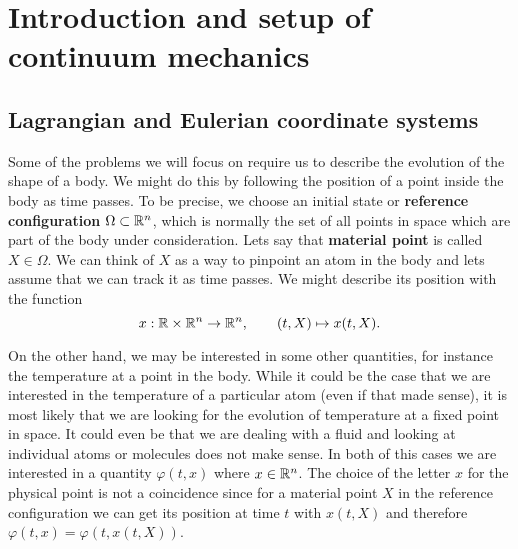 \section{Introduction and setup of continuum mechanics}

\subsection{Lagrangian and Eulerian coordinate systems}

Some of the problems we will focus on require us to describe the evolution of
the shape of a body. We might do this by following the position of a point
inside the body as time passes. To be precise, we choose an initial state or
\textbf{reference configuration} $\Omega \subset \mathbb{R}^n$, which is normally the
set of all points in space which are part of the body under consideration. Lets
say that \textbf{material point} is called $X \in \Omega$. We can think of $X$
as a way to pinpoint an atom in the body and lets assume that we can track it
as time passes. We might describe its position with the function
\[
  x : \mathbb{R} \times \mathbb{R}^n \to \mathbb{R}^n,\qquad (t, X) \mapsto x(t, X).
\]

On the other hand, we may be interested in some other quantities, for instance
the temperature at a point in the body. While it could be the case that we are
interested in the temperature of a particular atom (even if that made sense), it
is most likely that we are looking for the evolution of temperature at a fixed
point in space. It could even be that we are dealing with a fluid and looking
at individual atoms or molecules does not make sense. In both of this cases we
are interested in a quantity $\varphi(t, x)$ where $x \in \mathbb{R}^n$. The choice of
the letter $x$ for the physical point is not a coincidence since for a material
point $X$ in the reference configuration we can get its position at time  $t$
with $x(t, X)$ and therefore $\varphi(t, x) = \varphi(t, x(t, X))$.

